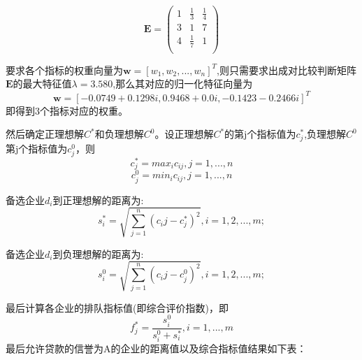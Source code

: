 \documentclass{cumcmthesis}
\begin{document}
\[
\mathbf{E} = \left(
\begin{array}{ccc}
1 &  \frac{1}{3} & \frac{1}{4}\\
3 &  1 & 7\\
4 &  \frac{1}{7} & 1\\
\end{array} \right)
\]

要求各个指标的权重向量为$\textbf{w}=[w_1,w_2,...,w_n]^T$,则只需要求出成对比较判断矩阵$\textbf{E}$的最大特征值$\lambda=3.580$,那么其对应的归一化特征向量为
\begin{equation}
\textbf{w}=[-0.0749 + 0.1298i,	0.9468+ 0.0i,-0.1423-0.2466i ]^T
\end{equation}
即得到3个指标对应的权重。

然后确定正理想解$C^*$和负理想解$C^0$。设正理想解$C^*$的第j个指标值为$c_j^*$,负理想解$C^0$第j个指标值为$c_j^0$，则
\begin{equation}
c_j^*=max_i c_{ij},j=1,...,n
\end{equation}
\begin{equation}
c_j^0=min_i c_{ij},j=1,...,n
\end{equation}

备选企业$d_i$到正理想解的距离为:
\begin{equation}
s_i^*=\sqrt{\sum_{j=1}^n(c_ij-c_j^*)^2},i=1,2,...,m;
\end{equation}

备选企业$d_i$到负理想解的距离为:
\begin{equation}
s_i^0=\sqrt{\sum_{j=1}^n(c_ij-c_j^0)^2},i=1,2,...,m;
\end{equation}

最后计算各企业的排队指标值(即综合评价指数)，即
\begin{equation}
f_j^*=\frac{s_i^0}{s_i^0+s_i^*},i=1,...,m
\end{equation}
最后允许贷款的信誉为A的企业的距离值以及综合指标值结果如下表：
\end{document}
